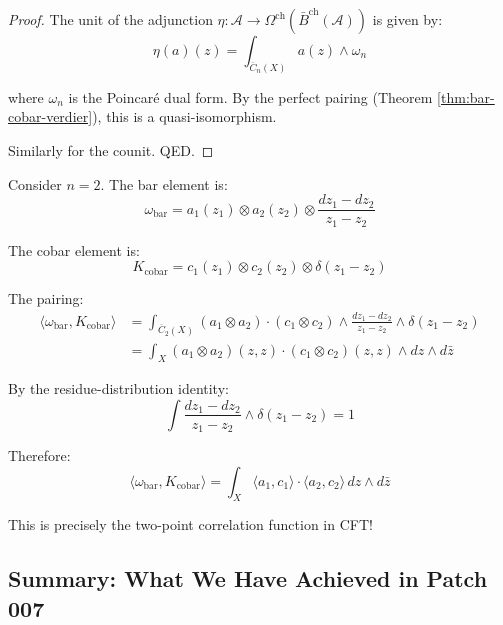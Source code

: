 \begin{proof}
The unit of the adjunction $\eta: \mathcal{A} \to \Omega^{\text{ch}}(\bar{B}^{\text{ch}}(\mathcal{A}))$ 
is given by:
$$\eta(a)(z) = \int_{\overline{C}_n(X)} a(z) \wedge \omega_n$$

where $\omega_n$ is the Poincaré dual form. By the perfect pairing (Theorem 
\ref{thm:bar-cobar-verdier}), this is a quasi-isomorphism.

Similarly for the counit. QED.
\end{proof}

\begin{example}\label{ex:pairing-two-point}

Consider $n=2$. The bar element is:
$$\omega_{\text{bar}} = a_1(z_1) \otimes a_2(z_2) \otimes \frac{dz_1 - dz_2}{z_1 - z_2}$$

The cobar element is:
$$K_{\text{cobar}} = c_1(z_1) \otimes c_2(z_2) \otimes \delta(z_1 - z_2)$$

The pairing:
\begin{align*}
\langle \omega_{\text{bar}}, K_{\text{cobar}} \rangle &= \int_{\overline{C}_2(X)} 
(a_1 \otimes a_2) \cdot (c_1 \otimes c_2) \wedge \frac{dz_1 - dz_2}{z_1 - z_2} 
\wedge \delta(z_1 - z_2) \\
&= \int_X (a_1 \otimes a_2)(z, z) \cdot (c_1 \otimes c_2)(z, z) \wedge dz \wedge d\bar{z}
\end{align*}

By the residue-distribution identity:
$$\int \frac{dz_1 - dz_2}{z_1 - z_2} \wedge \delta(z_1 - z_2) = 1$$

Therefore:
$$\langle \omega_{\text{bar}}, K_{\text{cobar}} \rangle = \int_X \langle a_1, c_1 
\rangle \cdot \langle a_2, c_2 \rangle \, dz \wedge d\bar{z}$$

This is precisely the two-point correlation function in CFT!
\end{example}

\subsection{Summary: What We Have Achieved in Patch 007}

